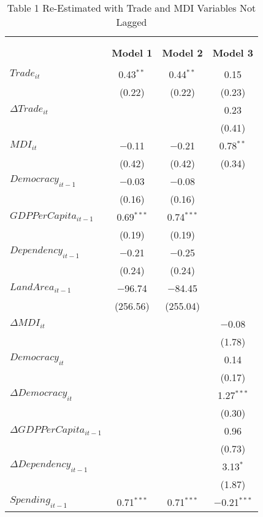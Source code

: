 
\begin{table}[!htbp] \centering 
  \caption{Table 1 Re-Estimated with Trade and MDI Variables Not Lagged} 
  \label{} 
\footnotesize 
\begin{tabular}{@{\extracolsep{5pt}}lccc} 
\\[-1.8ex]\hline \\[-1.8ex] 
\\[-1.8ex] & \textbf{Model 1} & \textbf{Model 2} & \textbf{Model 3}\\ 
\hline \\[-1.8ex] 
 $Trade_{it}$ & 0.43$^{**}$ & 0.44$^{**}$ & 0.15 \\ 
  & (0.22) & (0.22) & (0.23) \\ 
  $\Delta Trade_{it}$ &  &  & 0.23 \\ 
  &  &  & (0.41) \\ 
  $MDI_{it}$ & $-$0.11 & $-$0.21 & 0.78$^{**}$ \\ 
  & (0.42) & (0.42) & (0.34) \\ 
  $Democracy_{it-1}$ & $-$0.03 & $-$0.08 &  \\ 
  & (0.16) & (0.16) &  \\ 
  $GDPPerCapita_{it-1}$ & 0.69$^{***}$ & 0.74$^{***}$ &  \\ 
  & (0.19) & (0.19) &  \\ 
  $Dependency_{it-1}$ & $-$0.21 & $-$0.25 &  \\ 
  & (0.24) & (0.24) &  \\ 
  $LandArea_{it-1}$ & $-$96.74 & $-$84.45 &  \\ 
  & (256.56) & (255.04) &  \\ 
  $\Delta MDI_{it}$ &  &  & $-$0.08 \\ 
  &  &  & (1.78) \\ 
  $Democracy_{it}$ &  &  & 0.14 \\ 
  &  &  & (0.17) \\ 
  $\Delta Democracy_{it}$ &  &  & 1.27$^{***}$ \\ 
  &  &  & (0.30) \\ 
  $\Delta GDPPerCapita_{it-1}$ &  &  & 0.96 \\ 
  &  &  & (0.73) \\ 
  $\Delta Dependency_{it-1}$ &  &  & 3.13$^{*}$ \\ 
  &  &  & (1.87) \\ 
  $Spending_{it-1}$ & 0.71$^{***}$ & 0.71$^{***}$ & $-$0.21$^{***}$ \\ 

\end{tabular}
\end{table}
